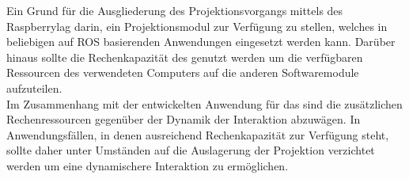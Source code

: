 Ein Grund für die Ausgliederung des Projektionsvorgangs mittels des Raspberry\red[Bezeichnung!] lag darin, ein Projektionsmodul zur Verfügung zu stellen, welches in beliebigen auf ROS basierenden Anwendungen eingesetzt werden kann. Darüber hinaus sollte die Rechenkapazität des \red[Raspberry] genutzt werden um die verfügbaren Ressourcen des verwendeten Computers auf die anderen Softwaremodule aufzuteilen.\\

Im Zusammenhang mit der entwickelten Anwendung für das \kps{} sind die zusätzlichen Rechenressourcen gegenüber der Dynamik der Interaktion abzuwägen. In Anwendungsfällen, in denen ausreichend Rechenkapazität zur Verfügung steht, sollte daher unter Umständen auf die Auslagerung der Projektion verzichtet werden um eine dynamischere Interaktion zu ermöglichen.